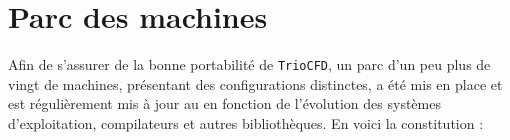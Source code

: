 
\chapter{\label{parc}Parc des machines}

Afin de s'assurer de la bonne portabilit\'e de \texttt{TrioCFD}, un parc d'un peu plus de vingt de machines, pr\'esentant des configurations distinctes, a \'et\'e mis en place et est r\'eguli\`erement mis \`a jour au en fonction de l'\'evolution des syst\`emes d'exploitation, compilateurs et autres biblioth\`eques. En voici la constitution : \smallskip\newpage

